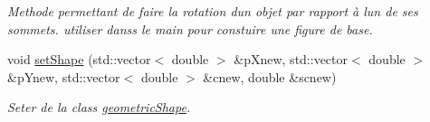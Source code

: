 \begin{DoxyCompactItemize}
\begin{DoxyCompactList}\small\item\em Methode permettant de faire la rotation d\textquotesingle{}un objet par rapport à l\textquotesingle{}un de ses sommets. utiliser danss le main pour constuire une figure de base. \end{DoxyCompactList}\item 
void \hyperlink{classgeometric_shape_1_1_shape_a393d5df22049c7c5efcab5f96a2d9018}{set\+Shape} (std\+::vector$<$ double $>$ \&p\+Xnew, std\+::vector$<$ double $>$ \&p\+Ynew, std\+::vector$<$ double $>$ \&cnew, double \&scnew)
\begin{DoxyCompactList}\small\item\em Seter de la class \hyperlink{namespacegeometric_shape}{geometric\+Shape}. \end{DoxyCompactList}\end{DoxyCompactItemize}
